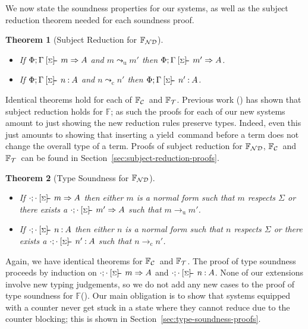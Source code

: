 \documentclass[msc,deptreport,cs]{infthesis} %
\newtheorem{theorem}{Theorem}
\newcommand\nondetfrank{$\mathbb{F}_{\cal{ND}}$}
\newcommand\countingfrank{$\mathbb{F}_{\cal{C}}$}
\newcommand\treefrank{$\mathbb{F}_{\cal{T}}$}
\newcommand\purefrank{$\mathbb{F}$}
\newcommand\yield{\textsf{yield}\xspace}
\newcommand{\sigentails}[1]{\mathbin{[{\text{\scriptsize ${#1}$}}]\hspace{-0.4ex}\text{-\!-}}\,}
\newcommand{\inferbase}[5]{#1; #3 \mathbin{#2} {#4} \Rightarrow {#5}}
\newcommand{\checkbase}[5]{#1; #3 \mathbin{#2} #5 \mathbin{:} #4}
\newcommand{\makes}[5]{\inferbase{#1}{\sigentails{#3}}{#2}{#4}{#5}}
\newcommand{\has}[5]{\checkbase{#1}{\sigentails{#3}}{#2}{#4}{#5}}
\newcommand{\infers}{\makes}
\newcommand{\checks}{\has}
\newcommand{\inferskgs}{\makes{\kenv}{\Gamma}{\sigs}}
\newcommand{\checkskgs}{\has{\kenv}{\Gamma}{\sigs}}
\newcommand{\sigs}{\Sigma}
\newcommand{\nowt}{\emptyset}
\newcommand{\redtou}{\leadsto_{\mathrm{u}}}
\newcommand{\redtoc}{\leadsto_{\mathrm{c}}}
\newcommand{\stepstou}{\longrightarrow_{\mathrm{u}}}
\newcommand{\stepstoc}{\longrightarrow_{\mathrm{c}}}
\newcommand{\kenv}{\Phi}  %
\begin{document}

We now state the soundness properties for our systems, as well as the subject
reduction theorem needed for each soundness proof.

\begin{theorem}[Subject Reduction for \nondetfrank]~
  \label{thm:sub-red}
\begin{itemize}
\item If $\inferskgs{m}{A}$ and $m \redtou m'$ then $\inferskgs{m'}{A}$.
\item If $\checkskgs{A}{n}$ and $n \redtoc n'$ then $\checkskgs{A}{n'}$.
\end{itemize}
\end{theorem}

Identical theorems hold for each of \countingfrank~and \treefrank. Previous work
(\cite{convent2020doo}) has shown that subject reduction holds for \purefrank;
as such the proofs for each of our new systems amount to just showing the new
reduction rules preserve types. Indeed, even this just amounts to showing that
inserting a \yield~command before a term does not change the overall type of a
term. Proofs of subject reduction for \nondetfrank, \countingfrank~and
\treefrank~can be found in Section~\ref{sec:subject-reduction-proofs}.




\begin{theorem}[Type Soundness for \nondetfrank]\label{thm:soundness}~
\begin{itemize}
\\
\item If $\infers{\cdot}{\cdot}{\sigs}{m}{A}$ then either $m$ is a normal form
  such that $m$ respects $\sigs$ or there exists a
  $\infers{\cdot}{\cdot}{\sigs}{m'}{A}$ such that $m \stepstou m'$.
\item If $\checks{\cdot}{\cdot}{\sigs}{A}{n}$ then either $n$ is a normal form
  such that $n$ respects $\sigs$ or there exists a
  $\checks{\cdot}{\cdot}{\sigs}{A}{n'}$ such that $n \stepstoc n'$.
\end{itemize}
\end{theorem}

Again, we have identical theorems for \countingfrank~and \treefrank. The proof
of type soundness proceeds by induction on $\infers{\cdot}{\cdot}{\sigs}{m}{A}$
and $\checks{\cdot}{\cdot}{\sigs}{A}{n}$. None of our extensions involve new
typing judgements, so we do not add any new cases to the proof of type soundness
for \purefrank(\cite{convent2020doo}). Our main obligation is to show that
systems equipped with a counter never get stuck in a state where they cannot
reduce due to the counter blocking; this is shown in
Section~\ref{sec:type-soundness-proofs}.
\end{document}
